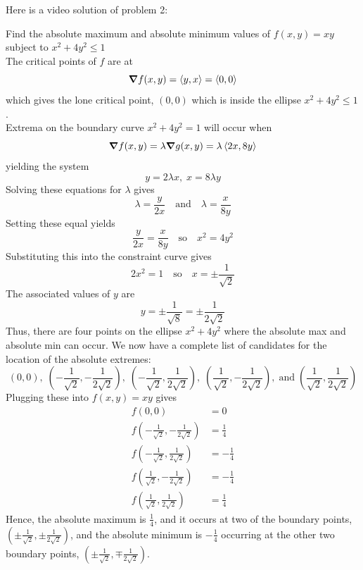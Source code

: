 \documentclass[handout]{ximera}
\begin{document}
Here is a video solution of problem 2:\\
\begin{foldable}
\end{foldable}


\begin{example}[Example 3]
Find the absolute maximum and absolute minimum values of $f(x,y) = xy$ subject to $x^2 + 4y^2 \leq 1$\\
The critical points of $f$ are at
\[
\boldsymbol\nabla f(x,y) = \left\langle y, x\right\rangle = \left\langle 0,0\right\rangle
\]
 which gives the lone critical point, $(0,0)$ which is inside the ellipse $x^2 + 4y^2 \leq 1$.\\
 Extrema on the boundary curve $x^2 + 4y^2 = 1$ will occur when
 \[
 \boldsymbol\nabla f(x,y) = \lambda \boldsymbol\nabla g(x,y) = \lambda \left\langle 2x, 8y\right\rangle
 \]
 yielding the system
 \[
 y = 2\lambda x, \; x = 8\lambda y
 \]
 Solving these equations for $\lambda$ gives
 \[
 \lambda = \frac{y}{2x} \quad \text{and} \quad \lambda = \frac{x}{8y}
 \]
 Setting these equal yields
 \[
 \frac{y}{2x} = \frac{x}{8y} \quad \text{so} \quad x^2 = 4y^2
 \]
Substituting this into the constraint curve gives
\[
2x^2 = 1 \quad \text{so} \quad x = \pm \frac{1}{\sqrt 2}
\]
The associated values of $y$ are 
\[
y = \pm \frac{1}{\sqrt 8} = \pm \frac{1}{2\sqrt 2}
\]
Thus, there are four points on the ellipse $x^2 + 4y^2$ where the absolute max and absolute min can occur.
We now have a complete list of candidates for the location of the absolute extremes:
 \[
 (0,0), \; \left(-\frac{1}{\sqrt 2},-\frac{1}{2\sqrt 2} \right), \; \left(-\frac{1}{\sqrt 2},\frac{1}{2\sqrt 2} \right),
  \; \left(\frac{1}{\sqrt 2},-\frac{1}{2\sqrt 2} \right), \;\text{and} \; \left(\frac{1}{\sqrt 2},\frac{1}{2\sqrt 2} \right)
 \]
 Plugging these into $f(x,y) = xy$ gives
 \begin{align*}
 f(0,0) &= 0\\
 f\left(-\frac{1}{\sqrt 2},-\frac{1}{2\sqrt 2} \right) &= \frac14\\
 f\left(-\frac{1}{\sqrt 2},\frac{1}{2\sqrt 2} \right) &= -\frac14\\
 f\left(\frac{1}{\sqrt 2},-\frac{1}{2\sqrt 2} \right) &= -\frac14\\
 f\left(\frac{1}{\sqrt 2},\frac{1}{2\sqrt 2} \right) &= \frac14
 \end{align*}
 Hence, the absolute maximum is $\frac{1}{4}$, and it occurs at two of the 
 boundary points, $\left(\pm \frac{1}{\sqrt 2}, \pm \frac{1}{2\sqrt 2}\right)$,
 and the absolute minimum is $-\frac{1}{4}$ occurring at the other two 
 boundary points, $\left(\pm \frac{1}{\sqrt 2}, \mp \frac{1}{2\sqrt 2}\right)$.
 
 
\end{example}
\end{document}
